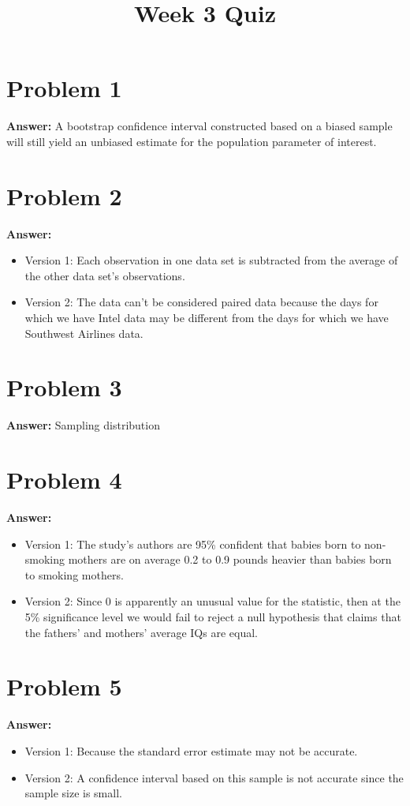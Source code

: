 \documentclass[11pt]{article}
\date{}
\title{Week 3 Quiz}
\begin{document}
\thispagestyle{empty}
\pagestyle{empty}
\section*{Problem 1}
\label{sec:orgf6b633d}

\textbf{Answer:} A bootstrap confidence interval constructed based on a biased sample
will still yield an unbiased estimate for the population parameter of interest.
\section*{Problem 2}
\label{sec:org8bb9b52}

\textbf{Answer:}
\begin{itemize}
\item Version 1: Each observation in one data set is subtracted from the average of
the other data set's observations.
\item Version 2: The data can't be considered paired data because the days for which
we have Intel data may be different from the days for which we have Southwest
Airlines data.
\end{itemize}
\section*{Problem 3}
\label{sec:org18358c3}

\textbf{Answer:} Sampling distribution
\section*{Problem 4}
\label{sec:org34a0409}

\textbf{Answer:}
\begin{itemize}
\item Version 1: The study's authors are 95\% confident that babies born to
non-smoking mothers are on average 0.2 to 0.9 pounds heavier than babies born
to smoking mothers.
\item Version 2: Since 0 is apparently an unusual value for the statistic, then at
the 5\% significance level we would fail to reject a null hypothesis that
claims that the fathers' and mothers' average IQs are equal.
\end{itemize}
\section*{Problem 5}
\label{sec:orgb5af664}

\textbf{Answer:}
\begin{itemize}
\item Version 1: Because the standard error estimate may not be accurate.
\item Version 2: A confidence interval based on this sample is not accurate since
the sample size is small.
\end{itemize}
\end{document}
